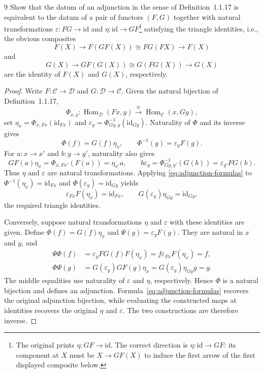 \begin{exercise}{9}
Show that the datum of an adjunction in the sense of Definition~1.1.17
is equivalent to the datum of a pair of functors $(F,G)$ together with
natural transformations $\varepsilon\colon FG\to\mathrm{id}$ and
$\eta\colon\mathrm{id}\to GF$\footnote{The original prints
$\eta\colon GF\to\mathrm{id}$. The correct direction is
$\eta\colon\mathrm{id}\to GF$: its component at $X$ must be
$X\to GF(X)$ to induce the first arrow of the first displayed
composite below.} satisfying the triangle identities, i.e., the
obvious composites
\[
 F(X)\to F(GF(X))\cong FG(FX)\to F(X)
\]
and
\[
 G(X)\to GF(G(X))\cong G(FG(X))\to G(X)
\]
are the identity of $F(X)$ and $G(X)$, respectively.

\begin{proof}
Write $F\colon\mathcal C\to\mathcal D$ and
$G\colon\mathcal D\to\mathcal C$. Given the natural bijection of
Definition~1.1.17,
\[
 \Phi_{x,y}\colon\operatorname{Hom}_{\mathcal D}(Fx,y)
       \xrightarrow{\cong}\operatorname{Hom}_{\mathcal C}(x,Gy),
\]
set
$\eta_x=\Phi_{x,Fx}(\mathrm{id}_{Fx})$ and
$\varepsilon_y=\Phi^{-1}_{Gy,y}(\mathrm{id}_{Gy})$.
Naturality of $\Phi$ and its inverse gives
\begin{equation}\label{eq:adjunction-formulas}
 \Phi(f)=G(f)\eta_x,\qquad
 \Phi^{-1}(g)=\varepsilon_yF(g).
\end{equation}
For $a\colon x\to x'$ and $b\colon y\to y'$, naturality also gives
\[
 GF(a)\eta_x=\Phi_{x,Fx'}(F(a))=\eta_{x'}a,
 \qquad
 b\varepsilon_y=\Phi^{-1}_{Gy,y'}(G(b))
                  =\varepsilon_{y'}FG(b).
\]
Thus $\eta$ and $\varepsilon$ are natural transformations.
Applying \eqref{eq:adjunction-formulas} to
$\Phi^{-1}(\eta_x)=\mathrm{id}_{Fx}$ and
$\Phi(\varepsilon_y)=\mathrm{id}_{Gy}$ yields
\[
 \varepsilon_{Fx}F(\eta_x)=\mathrm{id}_{Fx},\qquad
 G(\varepsilon_y)\eta_{Gy}=\mathrm{id}_{Gy},
\]
the required triangle identities.

Conversely, suppose natural transformations $\eta$ and $\varepsilon$
with these identities are given. Define
$\Phi(f)=G(f)\eta_x$ and $\Psi(g)=\varepsilon_yF(g)$.
They are natural in $x$ and $y$, and
\begin{align*}
 \Psi\Phi(f)
   &=\varepsilon_yFG(f)F(\eta_x)
     =f\varepsilon_{Fx}F(\eta_x)=f,\\
 \Phi\Psi(g)
   &=G(\varepsilon_y)GF(g)\eta_x
     =G(\varepsilon_y)\eta_{Gy}g=g.
\end{align*}
The middle equalities use naturality of $\varepsilon$ and $\eta$,
respectively. Hence $\Phi$ is a natural bijection and defines an
adjunction. Formula~\eqref{eq:adjunction-formulas} recovers the original
adjunction bijection, while evaluating the constructed maps at
identities recovers the original $\eta$ and $\varepsilon$.
The two constructions are therefore inverse.
\end{proof}
\end{exercise}
